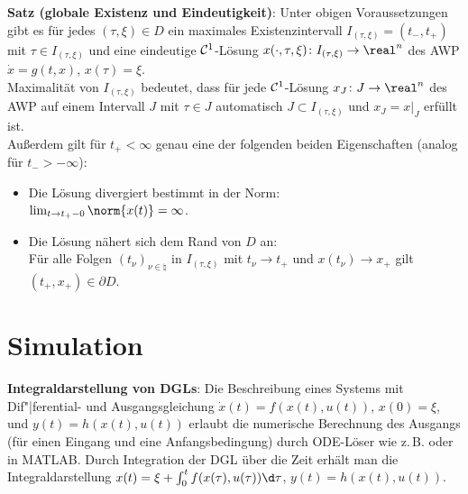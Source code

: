 \textbf{Satz (globale Existenz und Eindeutigkeit)}:
Unter obigen Voraussetzungen gibt es für jedes $(\tau, \xi) \in D$ ein
maximales Existenzintervall $I_{(\tau, \xi)} = (t_-, t_+)$ mit $\tau \in I_{(\tau, \xi)}$
und eine eindeutige $\mathcal{C}^1$-Lösung
$x(\cdot, \tau, \xi)\colon I_{(\tau, \xi)} \rightarrow \real^n$
des AWP $\dot{x} = g(t, x)$, $x(\tau) = \xi$.\\
Maximalität von $I_{(\tau, \xi)}$ bedeutet, dass für jede $\mathcal{C}^1$-Lösung
$x_J\colon J \rightarrow \real^n$ des AWP auf einem Intervall $J$ mit $\tau \in J$
automatisch $J \subset I_{(\tau, \xi)}$ und $x_J = x|_J$ erfüllt ist.\\
Außerdem gilt für $t_+ < \infty$ genau eine der folgenden beiden Eigenschaften
(analog für $t_- > -\infty$):
\begin{itemize}
    \item
    Die Lösung divergiert bestimmt in der Norm:\\
    $\lim_{t \to t_+-0} \norm{x(t)} = \infty$.

    \item
    Die Lösung nähert sich dem Rand von $D$ an:\\
    Für alle Folgen $(t_\nu)_{\nu \in \natural}$ in $I_{(\tau, \xi)}$ mit
    $t_\nu \to t_+$ und $x(t_\nu) \to x_+$
    gilt $(t_+, x_+) \in \partial D$.
\end{itemize}

\pagebreak

\section{%
    Simulation%
}

\textbf{Integraldarstellung von DGLs}:
Die Beschreibung eines Systems mit Dif"|ferential- und Ausgangsgleichung
$\dot{x}(t) = f(x(t), u(t))$, $x(0) = \xi$, und $y(t) = h(x(t), u(t))$
erlaubt die numerische Berechnung des Ausgangs (für einen Eingang und eine Anfangsbedingung)
durch ODE-Löser wie z.\,B.  oder  in MATLAB.
Durch Integration der DGL über die Zeit erhält man die Integraldarstellung
$x(t) = \xi + \int_0^t f(x(\tau), u(\tau))\d\tau$, $y(t) = h(x(t), u(t))$.


